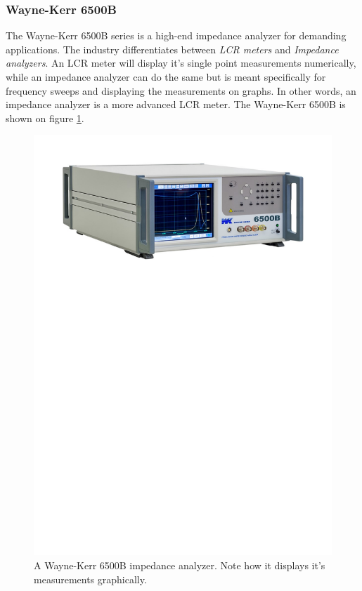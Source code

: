 \subsubsection*{Wayne-Kerr 6500B}
The Wayne-Kerr 6500B\cite{WayneKerr6500} series is a high-end impedance analyzer for demanding applications. The industry differentiates between \textit{LCR meters} and \textit{Impedance analyzers}. An LCR meter will display it's single point measurements numerically, while an impedance analyzer can do the same but is meant specifically for frequency sweeps and displaying the measurements on graphs. In other words, an impedance analyzer is a more advanced LCR meter. The Wayne-Kerr 6500B is shown on figure \ref{fig:2_2_WayneKerr6500B}. 
\begin{figure}[H]
    \centering
    \includegraphics[clip, trim=0 550 0 50, width=1\textwidth]{Sections/2_ProblemAnalysis/FIgures/WayneKerrImpedanceAnalyzer.pdf}
    \caption{A Wayne-Kerr 6500B impedance analyzer. Note how it displays it's measurements graphically.}
    \label{fig:2_2_WayneKerr6500B}
\end{figure}
